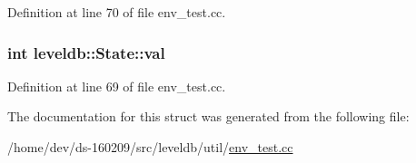 Definition at line 70 of file env\+\_\+test.\+cc.

\hypertarget{structleveldb_1_1_state_adfc3479f732e7396e735991e48963981}{}
\subsubsection[{val}]{\setlength{\rightskip}{0pt plus 5cm}int leveldb\+::\+State\+::val}\label{structleveldb_1_1_state_adfc3479f732e7396e735991e48963981}


Definition at line 69 of file env\+\_\+test.\+cc.



The documentation for this struct was generated from the following file\+:\begin{DoxyCompactItemize}
\item 
/home/dev/ds-\/160209/src/leveldb/util/\hyperlink{env__test_8cc}{env\+\_\+test.\+cc}\end{DoxyCompactItemize}
